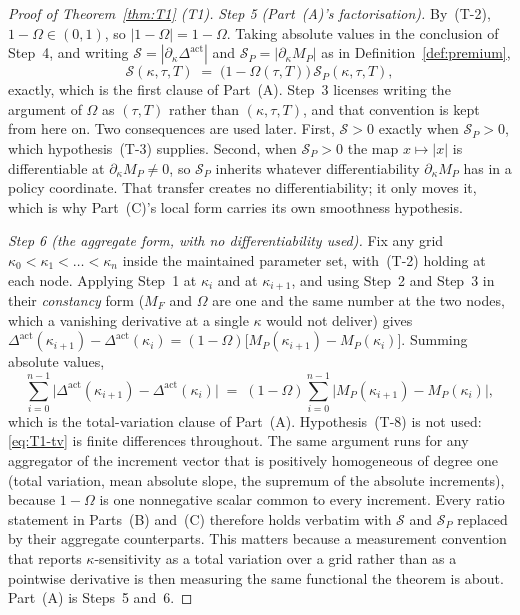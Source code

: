 \documentclass[11pt]{article}
\newcommand{\Dact}{\Delta^{\mathrm{act}}}
\begin{document}
\begin{proof}[Proof of Theorem~\ref{thm:T1} (T1)]
\emph{Step 5 (Part~(A)'s factorisation).} By~(T-2), $1-\Omega \in (0,1)$, so
$|1-\Omega| = 1-\Omega$. Taking absolute values in the conclusion of Step~4, and writing
$\mathcal S = |\partial_\kappa\Dact|$ and $\mathcal S_P = |\partial_\kappa M_P|$ as in
Definition~\ref{def:premium},
\begin{equation}
\label{eq:T1-factor}
\mathcal S(\kappa,\tau,T) \;=\; \bigl(1-\Omega(\tau,T)\bigr)\,\mathcal S_P(\kappa,\tau,T),
\end{equation}
exactly, which is the first clause of Part~(A). Step~3 licenses writing the argument of $\Omega$ as
$(\tau,T)$ rather than $(\kappa,\tau,T)$, and that convention is kept from here on. Two consequences
are used later. First, $\mathcal S > 0$ exactly when $\mathcal S_P > 0$, which hypothesis~(T-3)
supplies. Second, when $\mathcal S_P > 0$ the map $x \mapsto |x|$ is differentiable at
$\partial_\kappa M_P \neq 0$, so $\mathcal S_P$ inherits whatever differentiability
$\partial_\kappa M_P$ has in a policy coordinate. That transfer creates no differentiability; it
only moves it, which is why Part~(C)'s local form carries its own smoothness hypothesis.

\emph{Step 6 (the aggregate form, with no differentiability used).} Fix any grid
$\kappa_0 < \kappa_1 < \dots < \kappa_n$ inside the maintained parameter set, with~(T-2) holding at
each node. Applying Step~1 at $\kappa_i$ and at $\kappa_{i+1}$, and using Step~2 and Step~3 in their
\emph{constancy} form ($M_F$ and $\Omega$ are one and the same number at the two nodes, which a
vanishing derivative at a single $\kappa$ would not deliver) gives
$\Dact(\kappa_{i+1}) - \Dact(\kappa_i) = (1-\Omega)\bigl[M_P(\kappa_{i+1}) - M_P(\kappa_i)\bigr]$.
Summing absolute values,
\begin{equation}
\label{eq:T1-tv}
\sum_{i=0}^{n-1}\bigl\lvert \Dact(\kappa_{i+1}) - \Dact(\kappa_i)\bigr\rvert
\;=\; (1-\Omega)\sum_{i=0}^{n-1}\bigl\lvert M_P(\kappa_{i+1}) - M_P(\kappa_i)\bigr\rvert,
\end{equation}
which is the total-variation clause of Part~(A). Hypothesis~(T-8) is not used: \eqref{eq:T1-tv} is
finite differences throughout. The same argument runs for any aggregator of the increment vector
that is positively homogeneous of degree one (total variation, mean absolute slope, the supremum
of the absolute increments), because $1-\Omega$ is one nonnegative scalar common to every
increment. Every ratio statement in Parts~(B) and~(C) therefore holds verbatim with $\mathcal S$ and
$\mathcal S_P$ replaced by their aggregate counterparts. This matters because a measurement
convention that reports $\kappa$-sensitivity as a total variation over a grid rather than as a
pointwise derivative is then measuring the same functional the theorem is about. Part~(A) is
Steps~5 and~6.


\end{proof}
\end{document}
